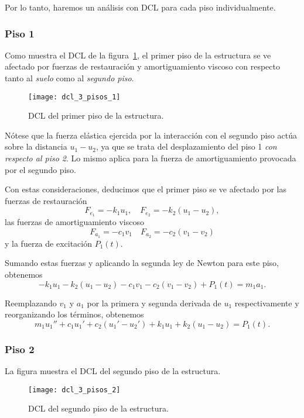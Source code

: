Por lo tanto, haremos un análisis con DCL para cada piso individualmente.

\subsubsection*{Piso 1}

Como muestra el DCL de la figura~\ref{fig:3-floor-dcl-1}, el primer piso de la estructura se ve afectado por fuerzas de restauración y amortiguamiento viscoso con respecto tanto al \textit{suelo} como al \textit{segundo piso}.

\begin{figure}[h]
    \centering
    \texttt{[image: dcl\_3\_pisos\_1]}
    \caption{DCL del primer piso de la estructura.}
    \label{fig:3-floor-dcl-1}
\end{figure}

Nótese que la fuerza elástica ejercida por la interacción con el segundo piso actúa sobre la distancia \(u_1 - u_2\), ya que se trata del desplazamiento del piso 1 \textit{con respecto al piso 2}. Lo mismo aplica para la fuerza de amortiguamiento provocada por el segundo piso.

Con estas consideraciones, deducimos que el primer piso se ve afectado por las fuerzas de restauración
\[
    F_{e_1} = -k_1 u_1, \quad F_{e_2} = -k_2(u_1 - u_2)
,\]
las fuerzas de amortiguamiento viscoso
\[
    F_{a_1} = -c_1 v_1 \quad F_{a_2} = -c_2(v_1 - v_2)
\]
y la fuerza de excitación \(P_1(t)\).

Sumando estas fuerzas y aplicando la segunda ley de Newton para este piso, obtenemos
\[
    -k_1 u_1 - k_2(u_1 - u_2) - c_1 v_1 - c_2(v_1 - v_2) + P_1(t) = m_1 a_1
.\]

Reemplazando \(v_1\) y \(a_1\) por la primera y segunda derivada de \(u_1\) respectivamente y reorganizando los términos, obtenemos
\begin{equation}\label{eqn:floor-1}
    m_1 u_1'' + c_1 u_1' + c_2(u_1' - u_2') + k_1 u_1 + k_2(u_1 - u_2) = P_1(t)
.\end{equation}


\subsubsection*{Piso 2}

La figura  muestra el DCL del segundo piso de la estructura.

\begin{figure}[h]
    \centering
    \texttt{[image: dcl\_3\_pisos\_2]}
    \caption{DCL del segundo piso de la estructura.}
    \label{fig:3-floor-dcl-2}
\end{figure}

